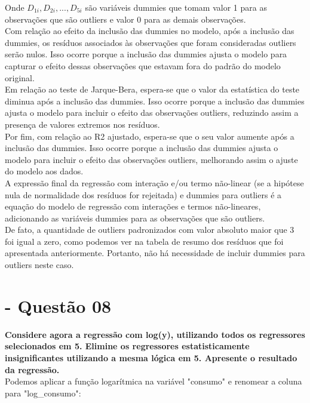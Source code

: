 \documentclass[a4paper, 12pt]{article}
\begin{document}
Onde $D_{1i}, D_{2i}, ..., D_{5i}$ são variáveis dummies que tomam valor 1 para as observações que são outliers e valor 0 para as demais observações.\\

Com relação ao efeito da inclusão das dummies no modelo, após a inclusão das dummies, os resíduos associados às observações que foram consideradas outliers serão nulos. Isso ocorre porque a inclusão das dummies ajusta o modelo para capturar o efeito dessas observações que estavam fora do padrão do modelo original.\\

Em relação ao teste de Jarque-Bera, espera-se que o valor da estatística do teste diminua após a inclusão das dummies. Isso ocorre porque a inclusão das dummies ajusta o modelo para incluir o efeito das observações outliers, reduzindo assim a presença de valores extremos nos resíduos.\\

Por fim, com relação ao R2 ajustado, espera-se que o seu valor aumente após a inclusão das dummies. Isso ocorre porque a inclusão das dummies ajusta o modelo para incluir o efeito das observações outliers, melhorando assim o ajuste do modelo aos dados.\\

A expressão final da regressão com interação e/ou termo não-linear (se a hipótese nula de normalidade dos resíduos for rejeitada) e dummies para outliers é a equação do modelo de regressão com interações e termos não-lineares, adicionando as variáveis dummies para as observações que são outliers.\\

De fato, a quantidade de outliers padronizados com valor absoluto maior que 3 foi igual a zero, como podemos ver na tabela de resumo dos resíduos que foi apresentada anteriormente. Portanto, não há necessidade de incluir dummies para outliers neste caso.\\


\section{- Questão 08}
\textbf{Considere agora a regressão com log(y), utilizando todos os regressores selecionados em 5.
Elimine os regressores estatisticamente insignificantes utilizando a mesma lógica em 5.
Apresente o resultado da regressão.} \\

Podemos aplicar a função logarítmica na variável "consumo" e renomear a coluna para "log\_consumo": \\
\end{document}
